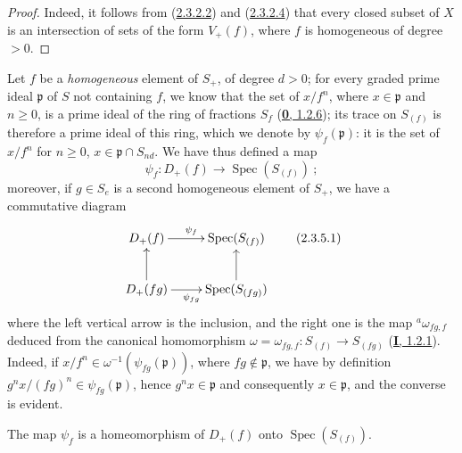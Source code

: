 \begin{proof}
Indeed, it follows from (\hyperref[II.2.3.2.2]{2.3.2.2}) and
(\hyperref[II.2.3.2.4]{2.3.2.4}) that every closed subset of $X$ is an
intersection of sets of the form $V_+(f)$, where $f$ is homogeneous of
degree $>0$.
\end{proof}

\begin{env}[2.3.5]
\label{II.2.3.5}
Let $f$ be a \emph{homogeneous} element of $S_+$, of degree $d>0$; for
every graded prime ideal $\mathfrak{p}$ of $S$ not containing $f$, we know
that the set of $x/f^n$, where $x\in\mathfrak{p}$ and $n\geq 0$, is a
prime ideal of the ring of fractions $S_f$
(\hyperref[0.1.2.6]{\textbf{0}, 1.2.6}); its trace on $S_{(f)}$ is therefore a
prime ideal of this ring, which we denote by
$\psi_f(\mathfrak{p})$: it is the set of $x/f^n$ for $n\geq 0$,
$x\in\mathfrak{p}\cap S_{nd}$. We have thus defined a map
\[
  \psi_f:D_+(f)\longrightarrow\operatorname{Spec}(S_{(f)})~;
\]
moreover, if $g\in S_e$ is a second homogeneous element of $S_+$, we have a
commutative diagram
\[
  \label{II.2.3.5.1}
  \xymatrix{
    D_+(f)\ar[r]^{\psi_f}
    & \operatorname{Spec}(S_{(f)})\\
    D_+(fg)\ar[u]\ar[r]_{\psi_{fg}}
    & \operatorname{Spec}(S_{(fg)})\ar[u]
  }
  \tag{2.3.5.1}
\]
where the left vertical arrow is the inclusion, and the right one is
the map ${}^a\omega_{fg,f}$ deduced from the canonical homomorphism
$\omega=\omega_{fg,f}:S_{(f)}\to S_{(fg)}$
(\hyperref[I.1.2.1]{\textbf{I}, 1.2.1}). Indeed, if
$x/f^n\in\omega^{-1}(\psi_{fg}(\mathfrak{p}))$, where
$fg\notin\mathfrak{p}$, we have by definition
$g^n x/(fg)^n\in\psi_{fg}(\mathfrak{p})$, hence
$g^n x\in\mathfrak{p}$ and consequently $x\in\mathfrak{p}$, and the converse
is evident.
\end{env}

\begin{proposition}[2.3.6]
\label{II.2.3.6}
The map $\psi_f$ is a homeomorphism of $D_+(f)$ onto
$\operatorname{Spec}(S_{(f)})$.
\end{proposition}

